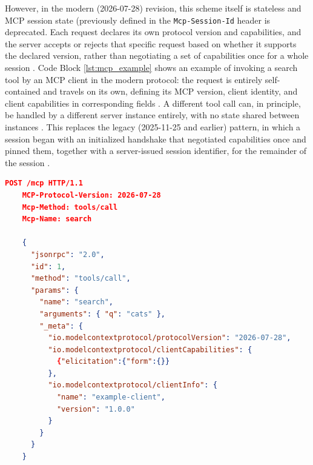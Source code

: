 \documentclass[english, 12pt, a4paper, elec, utf8, a-2b, online]{aaltothesis}
\begin{document}
However, in the modern (2026-07-28) revision, this scheme itself is stateless and MCP session state (previously defined in the \texttt{Mcp-Session-Id} header is deprecated. 
Each request declares its own protocol version and capabilities, and the server accepts or rejects that specific request based on whether it supports the declared version, rather than negotiating a set of capabilities once for a whole session \cite{mcpversioning2026, mcp_revision_blog}. 
Code Block \ref{lst:mcp_example} shows an example of invoking a search tool by an MCP client in the modern protocol: the request is entirely self-contained and travels on its own, defining its MCP version, client identity, and client capabilities in corresponding fields \cite{soriaparra2026spec}.
A different tool call can, in principle, be handled by a different server instance entirely, with no state shared between instances \cite{mcpchangelog2026}. 
This replaces the legacy (2025-11-25 and earlier) pattern, in which a session began with an initialized handshake that negotiated capabilities once and pinned them, together with a server-issued session identifier, for the remainder of the session \cite{mcpversioning2026}.
 
\begin{lstlisting}[language=JSON, caption={An example of client-to-server tool execution request, over HTTP, under the 2026-07-28 MCP specification. Because the protocol is now stateless, every request is self-contained: the request carries its own protocol version (\texttt{MCP-Protocol-Version} header), method and tool name (\texttt{Mcp-Method} and \texttt{Mcp-Name} headers), and client identity and capabilities (\texttt{\_meta} object) in every call, rather than relying on a persistent session established by an earlier handshake.  The code is adapted from the MCP specification changelog \cite{mcpchangelog2026} and the official blog \cite{soriaparra2026spec}.}, label={lst:mcp_example}]
    POST /mcp HTTP/1.1
    MCP-Protocol-Version: 2026-07-28
    Mcp-Method: tools/call
    Mcp-Name: search
    
    {
      "jsonrpc": "2.0",
      "id": 1,
      "method": "tools/call",
      "params": {
        "name": "search",
        "arguments": { "q": "cats" },
        "_meta": {
          "io.modelcontextprotocol/protocolVersion": "2026-07-28",
          "io.modelcontextprotocol/clientCapabilities": {
            {"elicitation":{"form":{}}
          },
          "io.modelcontextprotocol/clientInfo": {
            "name": "example-client",
            "version": "1.0.0"
          }
        }
      }
    }
\end{lstlisting}
\end{document}
